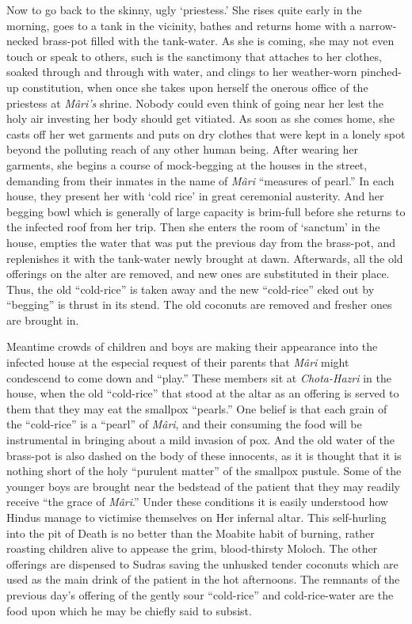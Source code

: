 \documentclass[a4paper, 12pt, oneside, english, twocolumn]{article}
\begin{document}
Now to go back to the skinny, ugly `priestess.' She rises quite early in the morning, goes to a tank in the vicinity, bathes and returns home with a narrow-necked brass-pot filled with the tank-water. As she is coming, she may not even touch or speak to others, such is the sanctimony that attaches to her clothes, soaked through and through with water, and clings to her weather-worn pinched-up constitution, when once she takes upon herself the onerous office of the priestess at \emph{Mâri's} shrine. Nobody could even think of going near her lest the holy air investing her body should get vitiated. As soon as she comes home, she casts off her wet garments and puts on dry clothes that were kept in a lonely spot beyond the polluting reach of any other human being. After wearing her garments, she begins a course of mock-begging at the houses in the street, demanding from their inmates in the name of \emph{Mâri} ``measures of pearl.'' In each house, they present her with `cold rice' in great ceremonial austerity. And her begging bowl which is generally of large capacity is brim-full before she returns to the infected roof from her trip. Then she enters the room of `sanctum' in the house, empties the water that was put the previous day from the brass-pot, and replenishes it with the tank-water newly brought at dawn. Afterwards, all the old offerings on the alter are removed, and new ones are substituted in their place. Thus, the old ``cold-rice'' is taken away and the new ``cold-rice'' eked out by ``begging'' is thrust in its stend. The old coconuts are removed and fresher ones are brought in.

Meantime crowds of children and boys are making their appearance into the infected house at the especial request of their parents that \emph{Mâri} might condescend to come down and ``play.'' These members sit at \emph{Chota-Hazri} in the house, when the old ``cold-rice'' that stood at the altar as an offering is served to them that they may eat the smallpox ``pearls.'' One belief is that each grain of the ``cold-rice'' is a ``pearl'' of \emph{Mâri}, and their consuming the food will be instrumental in bringing about a mild invasion of pox. And the old water of the brass-pot is also dashed on the body of these innocents, as it is thought that it is nothing short of the holy ``purulent matter'' of the smallpox pustule. Some of the younger boys are brought near the bedstead of the patient that they may readily receive ``the grace of \emph{Mâri}.'' Under these conditions it is easily understood how Hindus manage to victimise themselves on Her infernal altar. This self-hurling into the pit of Death is no better than the Moabite habit of burning, rather roasting children alive to appease the grim, blood-thirsty Moloch. The other offerings are dispensed to Sudras saving the unhusked tender coconuts which are used as the main drink of the patient in the hot afternoons. The remnants of the previous day's offering of the gently sour ``cold-rice'' and cold-rice-water are the food upon which he may be chiefly said to subsist.
\end{document}
